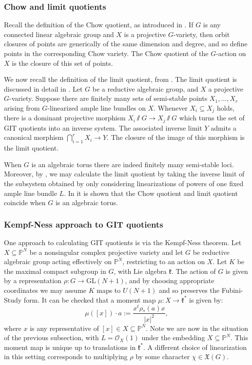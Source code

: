 \documentclass{amsart}
\theoremstyle{definition}
\newcommand{\PP}{\mathbb{P}}
\begin{document}
\subsubsection{Chow and limit quotients}
Recall the definition of the Chow quotient, as introduced in \cite{kapranov1993}. If \(G\) is any connected linear algebraic group and \(X\) is a projective \(G\)-variety, then orbit closures of points are generically of the same dimension and degree, and so define points in the corresponding Chow variety. The Chow quotient of the \(G\)-action on \(X\) is the closure of this set of points.

We now recall the definition of the limit quotient, from \cite{mumford1994}. The limit quotient is discussed in detail in \cite{baker2012}. Let \(G\) be a reductive algebraic group, and \(X\) a projective \(G\)-variety. Suppose there are finitely many sets of semi-stable points \(X_1,\dots,X_r\) arising from \(G\)-linearized ample line bundles on \(X\).  Whenever \(X_i \subseteq X_j\) holds, there is a dominant projective morphism \(X_i \sslash G \to X_j \sslash G\) which turns the set of GIT quotients into an inverse system. The associated inverse limit \(Y\) admits a canonical morphism \(\bigcap_{i=1}^r X_i \to Y\). The closure of the image of this morphism is the limit quotient.

When \(G\) is an algebraic torus there are indeed finitely many semi-stable loci. Moreover, by \cite[Corollary 2.7]{baker2012}, we may calculate the limit quotient by taking the inverse limit of the subsystem obtained by only considering linearizations of powers of one fixed ample line bundle \(L\).
%
%
%
In \cite[Proposition 2.5]{baker2012} it is shown that the Chow quotient and limit quotient coincide when \(G\) is an algebraic torus.
\subsubsection{Kempf-Ness approach to GIT quotients}
One approach to calculating GIT quotients is via the Kempf-Ness theorem. Let \(X \subseteq \PP^N\) be a nonsingular complex projective variety and let \(G\) be reductive algebraic group acting effectively on \(\PP^N\), restricting to an action on \(X\). Let \(K\) be the maximal compact subgroup in \(G\), with Lie algebra \(\mathfrak{k}\). The action of \(G\) is given by a representation \(\rho: G \to \text{GL}(N+1)\), and by choosing appropriate coordinates we may assume \(K\) maps to \(U(N+1)\) and so preserves the Fubini-Study form. It can be checked that a moment map \(\mu: X \to \mathfrak{k}^*\) is given by:
\begin{equation}\label{eq:mu}
\mu([x]) \cdot a := \frac{x^t \rho_*(a) x}{ |x|^2},
\end{equation}
where \(x\) is any representative of \([x] \in X \subseteq \PP^N\). Note we are now in the situation of the previous subsection, with \(L = \mathcal{O}_X(1)\) under the embedding \(X \subseteq \PP^N\). This moment map is unique up to translations in \(\mathfrak{k}^*\). A different choice of linearization in this setting corresponds to multiplying \(\rho\) by some character \(\chi \in \mathfrak{X}(G)\).
\end{document}
